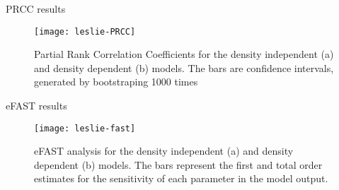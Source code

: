 \documentclass[final]{beamer}
\begin{document}
\begin{frame}{}
\begin{columns}[t]
\begin{column}{.48\linewidth}
        \begin{block}{PRCC results}
		\begin{figure}
		\begin{center}
		\texttt{[image: leslie-PRCC]}
		\end{center}
		\caption{Partial Rank Correlation Coefficients for the density independent (a) and density dependent (b) models. The bars are confidence intervals, generated by bootstraping 1000 times}
		\end{figure}
        \end{block}
\vfill
        \begin{block}{eFAST results}
		\begin{figure}
		\begin{center}
		\texttt{[image: leslie-fast]}
		\end{center}
		\caption{eFAST analysis for the density independent (a) and density dependent (b) models. The bars represent the first and total order estimates for the sensitivity of each parameter in the model output.}
		\end{figure}
        \end{block}
      \end{column}
    \end{columns}
  \end{frame}
\end{document}
